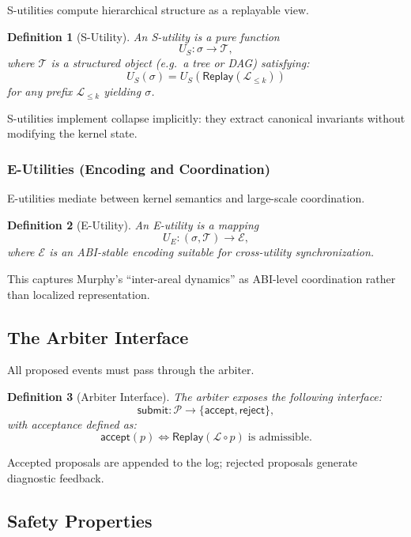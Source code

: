 \documentclass[11pt]{article}
\newtheorem{definition}{Definition}
\begin{document}
S-utilities compute hierarchical structure as a replayable view.

\begin{definition}[S-Utility]
An S-utility is a pure function
\[
U_S : \sigma \to \mathcal{T},
\]
where $\mathcal{T}$ is a structured object (e.g.\ a tree or DAG) satisfying:
\[
U_S(\sigma) = U_S(\mathsf{Replay}(\mathcal{L}_{\leq k}))
\]
for any prefix $\mathcal{L}_{\leq k}$ yielding $\sigma$.
\end{definition}

S-utilities implement collapse implicitly: they extract canonical invariants without modifying the kernel state.

\subsubsection{E-Utilities (Encoding and Coordination)}

E-utilities mediate between kernel semantics and large-scale coordination.

\begin{definition}[E-Utility]
An E-utility is a mapping
\[
U_E : (\sigma, \mathcal{T}) \to \mathcal{E},
\]
where $\mathcal{E}$ is an ABI-stable encoding suitable for cross-utility synchronization.
\end{definition}

This captures Murphy’s “inter-areal dynamics” as ABI-level coordination rather than localized representation.

\subsection{The Arbiter Interface}

All proposed events must pass through the arbiter.

\begin{definition}[Arbiter Interface]
The arbiter exposes the following interface:
\[
\mathsf{submit} : \mathcal{P} \to \{\mathsf{accept}, \mathsf{reject}\},
\]
with acceptance defined as:
\[
\mathsf{accept}(p) \iff \mathsf{Replay}(\mathcal{L} \circ p) \;\text{is admissible}.
\]
\end{definition}

Accepted proposals are appended to the log; rejected proposals generate diagnostic feedback.

\subsection{Safety Properties}
\end{document}

